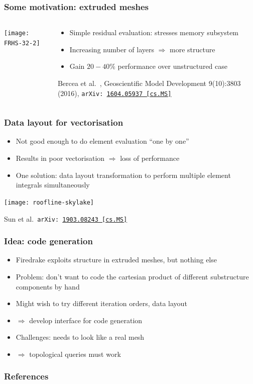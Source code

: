 \documentclass[presentation,aspectratio=43, 10pt]{beamer}
\newcommand{\arxivlink}[2]{{\texttt{arXiv:\,\href{https://arxiv.org/abs/#1}{#1\,[#2]}}}}
\begin{document}
\begin{frame}
  \frametitle{Some motivation: extruded meshes}
  \begin{columns}
    \begin{column}{0.6\textwidth}
      \texttt{[image: FRHS-32-2]}
    \end{column}
    \hspace{-1em}
    \begin{column}{0.45\textwidth}
      \begin{itemize}
      \item Simple residual evaluation: stresses memory subsystem
      \item Increasing number of layers $\Rightarrow$ more structure
      \item Gain $20-40\%$ performance over unstructured case
      \end{itemize}
      \begin{flushright}
        {\footnotesize Bercea et al.~, Geoscientific Model Development
          9(10):3803 (2016), \arxivlink{1604.05937}{cs.MS}}
      \end{flushright}
    \end{column}
  \end{columns}
\end{frame}

\begin{frame}
  \frametitle{Data layout for vectorisation}
  \begin{itemize}
  \item Not good enough to do element evaluation ``one by one''
  \item Results in poor vectorisation $\Rightarrow$ loss of
    performance
  \item One solution: data layout transformation to perform multiple
    element integrals simultaneously
  \end{itemize}
  \begin{center}
    \texttt{[image: roofline-skylake]}
  \end{center}
      \begin{flushright}
        {\footnotesize Sun et al.~\arxivlink{1903.08243}{cs.MS}}
      \end{flushright}
\end{frame}

\begin{frame}
  \frametitle{Idea: code generation}
  \begin{itemize}
  \item Firedrake exploits structure in extruded meshes, but nothing
    else
  \item Problem: don't want to code the cartesian product of different
    substructure components by hand
  \item Might wish to try different iteration orders, data layout
    
  \item $\Rightarrow$ develop interface for code generation
  \item Challenges: needs to look like a real mesh
  \item $\Rightarrow$ topological queries must work
  \end{itemize}
\end{frame}

\appendix
\begin{frame}
  \frametitle{References}
  \printbibliography[heading=none]
\end{frame}
\end{document}
